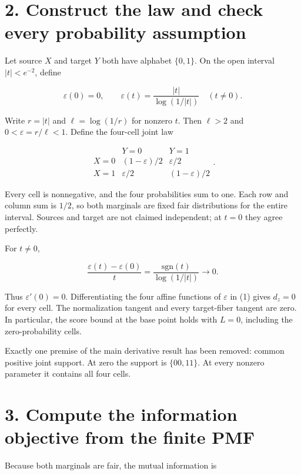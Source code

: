 \documentclass[11pt,a4paper]{article}
\begin{document}
\section{2. Construct the law and check every probability assumption}\label{construct-the-law-and-check-every-probability-assumption}

Let source \(X\) and target \(Y\) both have alphabet \(\{0,1\}\). On the open interval \(|t|<e^{-2}\), define

\[
\varepsilon(0)=0,\qquad
\varepsilon(t)=\frac{|t|}{\log(1/|t|)}\quad(t\ne0).
\]

Write \(r=|t|\) and \(\ell=\log(1/r)\) for nonzero \(t\). Then \(\ell>2\) and \(0<\varepsilon=r/\ell<1\). Define the four-cell joint law

\[
\begin{array}{c|cc}
&Y=0&Y=1\\ \hline
X=0&(1-\varepsilon)/2&\varepsilon/2\\
X=1&\varepsilon/2&(1-\varepsilon)/2
\end{array}. \tag{1}
\]

Every cell is nonnegative, and the four probabilities sum to one. Each row and column sum is \(1/2\), so both marginals are fixed fair distributions for the entire interval. Sources and target are not claimed independent; at \(t=0\) they agree perfectly.

For \(t\ne0\),

\[
\frac{\varepsilon(t)-\varepsilon(0)}{t}
=\frac{\mathrm{sgn}(t)}{\log(1/|t|)}
\longrightarrow0.
\]

Thus \(\varepsilon'(0)=0\). Differentiating the four affine functions of \(\varepsilon\) in (1) gives \(d_z=0\) for every cell. The normalization tangent and every target-fiber tangent are zero. In particular, the score bound at the base point holds with \(L=0\), including the zero-probability cells.

Exactly one premise of the main derivative result has been removed: common positive joint support. At zero the support is \(\{00,11\}\). At every nonzero parameter it contains all four cells.

\section{3. Compute the information objective from the finite PMF}\label{compute-the-information-objective-from-the-finite-pmf}

Because both marginals are fair, the mutual information is
\end{document}
